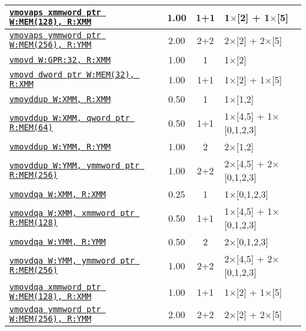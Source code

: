 \documentclass[a4paper,english,fontsize=9]{scrartcl}
\begin{document}
\begin{longtable}{p{}ccL{.25\textwidth}}
  \midrule
  \texttt{\href{https://felixcloutier.com/x86/MOVAPS.html}{vmovaps xmmword ptr W:MEM(128), R:XMM}} & 1.00 & 1+1 & 1\(\times\)[2] + 1\(\times\)[5] \\
  \midrule
  \texttt{\href{https://felixcloutier.com/x86/MOVAPS.html}{vmovaps ymmword ptr W:MEM(256), R:YMM}} & 2.00 & 2+2 & 2\(\times\)[2] + 2\(\times\)[5] \\
  \midrule
  \texttt{\href{https://felixcloutier.com/x86/MOVD:MOVQ.html}{vmovd W:GPR:32, R:XMM}} & 1.00 & 1 & 1\(\times\)[2] \\
  \midrule
  \texttt{\href{https://felixcloutier.com/x86/MOVD:MOVQ.html}{vmovd dword ptr W:MEM(32), R:XMM}} & 1.00 & 1+1 & 1\(\times\)[2] + 1\(\times\)[5] \\
  \midrule
  \texttt{\href{https://felixcloutier.com/x86/MOVDDUP.html}{vmovddup W:XMM, R:XMM}} & 0.50 & 1 & 1\(\times\)[1,2] \\
  \midrule
  \texttt{\href{https://felixcloutier.com/x86/MOVDDUP.html}{vmovddup W:XMM, qword ptr R:MEM(64)}} & 0.50 & 1+1 & 1\(\times\)[4,5] + 1\(\times\)[0,1,2,3] \\
  \midrule
  \texttt{\href{https://felixcloutier.com/x86/MOVDDUP.html}{vmovddup W:YMM, R:YMM}} & 1.00 & 2 & 2\(\times\)[1,2] \\
  \midrule
  \texttt{\href{https://felixcloutier.com/x86/MOVDDUP.html}{vmovddup W:YMM, ymmword ptr R:MEM(256)}} & 1.00 & 2+2 & 2\(\times\)[4,5] + 2\(\times\)[0,1,2,3] \\
  \midrule
  \texttt{\href{https://felixcloutier.com/x86/MOVDQA:VMOVDQA32:VMOVDQA64.html}{vmovdqa W:XMM, R:XMM}} & 0.25 & 1 & 1\(\times\)[0,1,2,3] \\
  \midrule
  \texttt{\href{https://felixcloutier.com/x86/MOVDQA:VMOVDQA32:VMOVDQA64.html}{vmovdqa W:XMM, xmmword ptr R:MEM(128)}} & 0.50 & 1+1 & 1\(\times\)[4,5] + 1\(\times\)[0,1,2,3] \\
  \midrule
  \texttt{\href{https://felixcloutier.com/x86/MOVDQA:VMOVDQA32:VMOVDQA64.html}{vmovdqa W:YMM, R:YMM}} & 0.50 & 2 & 2\(\times\)[0,1,2,3] \\
  \midrule
  \texttt{\href{https://felixcloutier.com/x86/MOVDQA:VMOVDQA32:VMOVDQA64.html}{vmovdqa W:YMM, ymmword ptr R:MEM(256)}} & 1.00 & 2+2 & 2\(\times\)[4,5] + 2\(\times\)[0,1,2,3] \\
  \midrule
  \texttt{\href{https://felixcloutier.com/x86/MOVDQA:VMOVDQA32:VMOVDQA64.html}{vmovdqa xmmword ptr W:MEM(128), R:XMM}} & 1.00 & 1+1 & 1\(\times\)[2] + 1\(\times\)[5] \\
  \midrule
  \texttt{\href{https://felixcloutier.com/x86/MOVDQA:VMOVDQA32:VMOVDQA64.html}{vmovdqa ymmword ptr W:MEM(256), R:YMM}} & 2.00 & 2+2 & 2\(\times\)[2] + 2\(\times\)[5] \\

\end{longtable}
\end{document}
